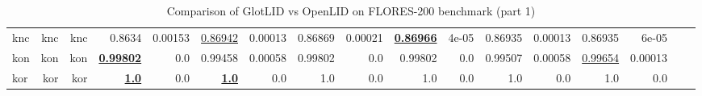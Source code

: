 \documentclass[11pt]{article}
\def\flores{FLORES\xspace}
\def\edin{OpenLID\xspace}
\begin{document}
\begin{table*}[h]
{\begin{tabular}{lrrrrrrrrrrrrrrrr}
knc         & knc         & knc         & 0.8634         & 0.00153         & \underline{0.86942}         & 0.00013         & 0.86869         & 0.00021         & \textbf{\underline{0.86966}}         & 4e-05         & 0.86935         & 0.00013         & 0.86935         & 6e-05         \\
kon         & kon         & kon         & \textbf{\underline{0.99802}}         & 0.0         & 0.99458         & 0.00058         & 0.99802         & 0.0         & 0.99802         & 0.0         & 0.99507         & 0.00058         & \underline{0.99654}         & 0.00013         \\
kor         & kor         & kor         & \textbf{\underline{1.0}}         & 0.0         & \textbf{\underline{1.0}}         & 0.0         & 1.0         & 0.0         & 1.0         & 0.0         & 1.0         & 0.0         & 1.0         & 0.0         \\
\end{tabular}
}
\caption{Comparison of GlotLID vs \edin on \flores-200 benchmark (part 1)}
\label{tab:appendix_glotlid_lid201_floress_1}
\end{table*}
\end{document}
